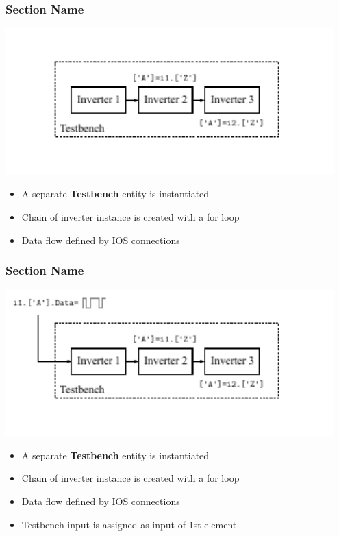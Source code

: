 \documentclass{sdkslides}
\newcommand{\sectname}{Section Name}
\begin{document}
\begin{frame}[t]
    \frametitle{\sectname}
    \centering
    \includegraphics[width=0.95\textwidth]{Pics/inverter_chain_2}
    \begin{itemize}
        \item A separate \textbf{Testbench} entity is instantiated
        \item Chain of inverter instance is created with a for loop
        \item Data flow defined by IOS connections
    \end{itemize}
\end{frame}


\begin{frame}[t]
    \frametitle{\sectname}
    \centering
    \includegraphics[width=0.95\textwidth]{Pics/inverter_chain_3}
    \begin{itemize}
        \item A separate \textbf{Testbench} entity is instantiated
        \item Chain of inverter instance is created with a for loop
        \item Data flow defined by IOS connections
        \item Testbench input is assigned as input of 1st element
    \end{itemize}
\end{frame}
\end{document}
